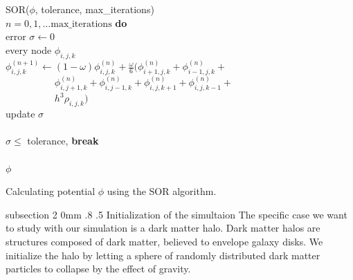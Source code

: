 \documentclass[notitlepage, 12pt]{article}
\makeatletter
\renewcommand{\subsection}{\@startsection    %
        {subsection}
        {2}
        {0mm}
        {.8\baselineskip}
        {.5\baselineskip}
        {\bfseries\normalsize}}
\makeatother
\begin{document}
\begin{algorithm}[H]
\hspace{0.1\textwidth}\parbox{.8\textwidth}{
\-\hspace{0ex}{\bf function} SOR($\phi$, tolerance, max\_iterations)\\
\-\hspace{4ex}{\bf for} $n = 0,1,\ldots\mbox{max\_iterations}$ {\bf do}\\
\-\hspace{8ex}error $\sigma\leftarrow 0$\\
\-\hspace{8ex}{\bf for} every node $\phi_{i,j,k}$\\
\-\hspace{12ex}$\phi_{i,j,k}^{(n+1)} \leftarrow (1-\omega)\phi_{i,j,k}^{(n)} + \frac{\omega}{6} (\phi_{i+1,j,k}^{(n)} +\phi_{i-1,j,k}^{(n)}+$\\
\-\hspace{12ex}$\phantom{\phi_{i,j,k}^{(n+1)} \leftarrow }\phi_{i,j+1,k}^{(n)}+ \phi_{i,j-1,k}^{(n)} + \phi_{i,j,k+1}^{(n)} + \phi_{i,j,k-1}^{(n)} +$\\
\-\hspace{12ex}$\phantom{\phi_{i,j,k}^{(n+1)} \leftarrow} h^3\rho_{i,j,k})$\\
\-\hspace{12ex}update $\sigma$\\
\-\hspace{8ex}{\bf end for}\\
\-\hspace{8ex}{\bf if} $\sigma \leq $ tolerance, {\bf break}\\
\-\hspace{4ex}{\bf end for}\\
\-\hspace{4ex}{\bf return} $\phi$\\
\-\hspace{0ex}{\bf end function}}
\caption{Calculating potential $\phi$ using the SOR algorithm.}
\label{alg:poissonsolver}
\end{algorithm}




\subsection{Initialization of the simultaion}
The specific case we want to study with our simulation is a dark matter halo. Dark matter halos are structures composed of dark matter, believed to envelope galaxy disks. We initialize the halo by letting a sphere of randomly distributed dark matter particles to collapse by the effect of gravity.
\end{document}
